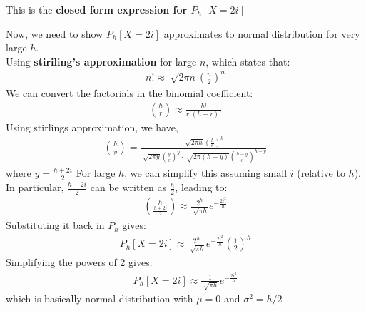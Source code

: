 \begin{solution}
	This is the \textbf{closed form expression for $P_h[X=2i]$}

	Now, we need to show $P_h[X=2i]$ approximates to normal distribution for very large $h$.\\
	Using \textbf{stiriling's approximation} for large $n$, which states that:
	\begin{align}
		n!\approx \sqrt[]{2\pi n}\left(\frac{n}{2}\right)^n
	\end{align}
	We can convert the factorials in the binomial coefficient:
	\begin{align}
		\binom{h}{r} \approx \frac{h!}{r!(h-r)!}
	\end{align}
	Using stirlings approximation, we have,
	\begin{align}
		\binom{h}{y} = \frac{\sqrt[]{2\pi h}\left(\frac{h}{e}\right)^h}{\sqrt[]{2\pi y}\left(\frac{y}{e}\right)^y\cdot \sqrt[]{2\pi(h-y)}\left(\frac{h-y}{e}\right)^{h-y}}
	\end{align}
	where $y = \frac{h+2i}{2}$
	For large $h$, we can simplify this assuming small $i$ (relative to $h$). In particular, $\frac{h+2i}{2}$ can be written as $\frac{h}{2}$, leading to:
	\begin{align}
		\binom{h}{\frac{h+2i}{2}} \approx \frac{2^h}{\sqrt[]{\pi h}}e^{-\frac{2i^2}{h}}
	\end{align}
	Substituting it back in $P_h$ gives:
	\begin{align}
		P_h[X=2i]\approx \frac{2^h}{\sqrt[]{\pi h}}e^{-\frac{2i^2}{h}}\left(\frac{1}{2}\right)^h
	\end{align}
	Simplifying the powers of 2 gives:
	\begin{align}
		P_h[X=2i]\approx \frac{1}{\sqrt[]{\pi h}}e^{-\frac{2i^2}{h}}
	\end{align}
	which is basically normal distribution with $\mu = 0$ and $\sigma^2=h/2$
\end{solution}
